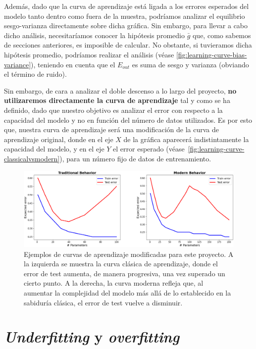 Además, dado que la curva de aprendizaje está ligada a los errores esperados del modelo tanto dentro como fuera de la muestra, podríamos analizar el equilibrio sesgo-varianza directamente sobre dicha gráfica. Sin embargo, para llevar a cabo dicho análisis, necesitaríamos conocer la hipótesis promedio $\bar{g}$ que, como sabemos de secciones anteriores, es imposible de calcular. No obstante, si tuvieramos dicha hipótesis promedio, podríamos realizar el análisis (véase \autoref{fig:learning-curve-bias-variance}), teniendo en cuenta que el $E_{out}$ es suma de sesgo y varianza (obviando el término de ruido).

Sin embargo, de cara a analizar el doble descenso a lo largo del proyecto, \textbf{no utilizaremos directamente la curva de aprendizaje} tal y como se ha definido, dado que nuestro objetivo es analizar el error con respecto a la capacidad del modelo y no en función del número de datos utilizados. Es por esto que, nuestra curva de aprendizaje será una modificación de la curva de aprendizaje original, donde en el eje $X$ de la gráfica aparecerá indistintamente la capacidad del modelo, y en el eje $Y$ el error esperado (véase~\autoref{fig:learning-curve-classicalvsmodern}), para un número fijo de datos de entrenamiento.

\begin{figure}[h]
    \centering
    \includegraphics[width=0.8\linewidth]{img/learning-curve-classicalvsmodern.png}
    \caption[Ejemplos de curvas de aprendizaje modificadas para este proyecto.] {Ejemplos de curvas de aprendizaje modificadas para este proyecto. A la izquierda se muestra la curva clásica de aprendizaje, donde el error de test aumenta, de manera progresiva, una vez superado un cierto punto. A la derecha, la curva moderna refleja que, al aumentar la complejidad del modelo más allá de lo establecido en la sabiduría clásica, el error de test vuelve a disminuir.}\label{fig:learning-curve-classicalvsmodern}
\end{figure}

\section{\textit{Underfitting} y \textit{overfitting}}\label{sec:subsec-underfitting-y-overfitting}

